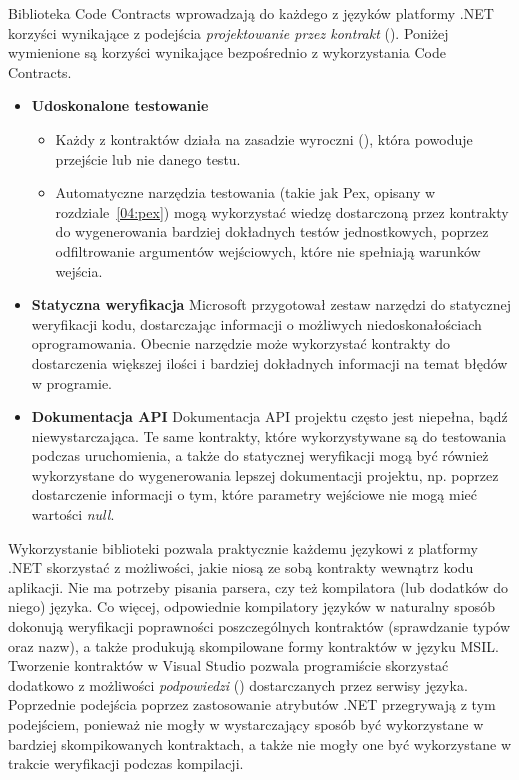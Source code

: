 Biblioteka Code Contracts wprowadzają do każdego z języków platformy .NET korzyści wynikające z podejścia \emph{projektowanie przez kontrakt} (). Poniżej wymienione są korzyści wynikające bezpośrednio z wykorzystania Code Contracts.

\begin{itemize}
	\item \textbf{Udoskonalone testowanie}
		\begin{itemize}
			\item Każdy z kontraktów działa na zasadzie wyroczni (), która powoduje przejście lub nie danego testu.
			\item Automatyczne narzędzia testowania (takie jak Pex, opisany w rozdziale~\ref{04:pex}) mogą wykorzystać wiedzę dostarczoną przez kontrakty do wygenerowania bardziej dokładnych testów jednostkowych, poprzez odfiltrowanie argumentów wejściowych, które nie spełniają warunków wejścia.
		\end{itemize}
	\item \textbf{Statyczna weryfikacja}
		Microsoft przygotował zestaw narzędzi do statycznej weryfikacji kodu, dostarczając informacji o możliwych niedoskonałościach oprogramowania. Obecnie narzędzie może wykorzystać kontrakty do dostarczenia większej ilości i bardziej dokładnych informacji na temat błędów w programie.
	\item \textbf{Dokumentacja API}
		Dokumentacja API projektu często jest niepełna, bądź niewystarczająca. Te same kontrakty, które wykorzystywane są do testowania podczas uruchomienia, a także do statycznej weryfikacji mogą być również wykorzystane do wygenerowania lepszej dokumentacji projektu, np. poprzez dostarczenie informacji o tym, które parametry wejściowe nie mogą mieć wartości \emph{null}.
\end{itemize}

Wykorzystanie biblioteki pozwala praktycznie każdemu językowi z platformy .NET skorzystać z możliwości, jakie niosą ze sobą kontrakty wewnątrz kodu aplikacji. Nie ma potrzeby pisania parsera, czy też kompilatora (lub dodatków do niego) języka. Co więcej, odpowiednie kompilatory języków w naturalny sposób dokonują weryfikacji poprawności poszczególnych kontraktów (sprawdzanie typów oraz nazw), a także produkują skompilowane formy kontraktów w języku MSIL. Tworzenie kontraktów w Visual Studio pozwala programiście skorzystać dodatkowo z możliwości \emph{podpowiedzi} () dostarczanych przez serwisy języka. Poprzednie podejścia poprzez zastosowanie atrybutów .NET przegrywają z tym podejściem, ponieważ nie mogły w wystarczający sposób być wykorzystane w bardziej skompikowanych kontraktach, a także nie mogły one być wykorzystane w trakcie weryfikacji podczas kompilacji.

